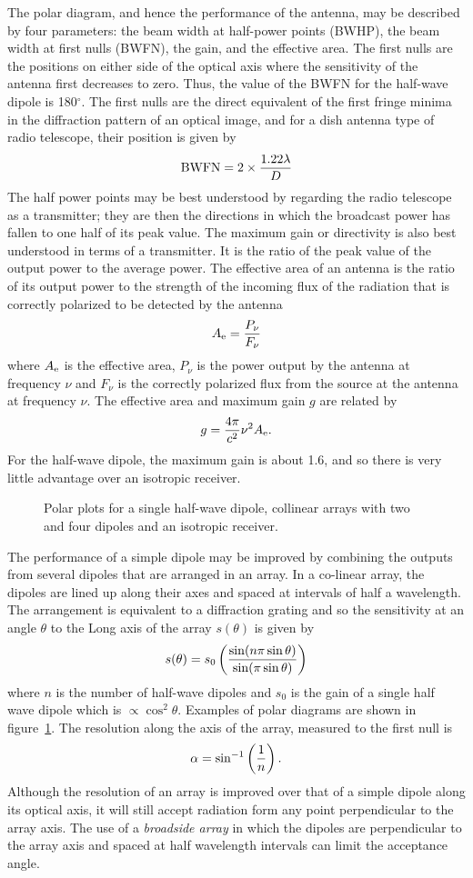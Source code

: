\documentclass{article}
\begin{document}
The polar diagram, and hence the performance of the antenna, may be described
by four parameters: the beam width at half-power points (BWHP), the 
beam width at first nulls (BWFN), the gain, and the effective area. The first
nulls are the positions on either side of the optical axis where the 
sensitivity of the antenna first decreases to zero. Thus, the value of the 
BWFN for the half-wave dipole is 180$^{\circ}$. The first nulls are the direct 
equivalent of the first fringe minima in the diffraction pattern of an optical
image, and for a dish antenna type of radio telescope, their position is given
by 
\[
{\rm BWFN}=2\times{1.22\lambda\over D}
\]
The half power points may be best understood by regarding the radio telescope
as a transmitter; they are then the directions in which the broadcast power
has fallen to one half of its peak value. The maximum gain or directivity
is also best understood in terms of a transmitter. It is the ratio of the 
peak value of the output power to the average power. The effective area of 
an antenna is the ratio of its output power to the strength of the incoming
flux of the radiation that is correctly polarized to be detected by the antenna
\[
A_{\rm e}={P_\nu\over F_\nu}
\]
where $A_{\rm e}$ is the effective area, $P_\nu$ is the power output by the 
antenna at frequency $\nu$ and $F_\nu$ is the correctly polarized flux from the
source at the antenna at frequency $\nu$. The effective area and maximum gain
$g$ are related by 
\[
g={4\pi\over c^2}\nu^2A_{\rm e}.
\]
For the half-wave dipole, the maximum gain is about 1.6, and so there is very
little advantage over an isotropic receiver. 

\begin{figure}[h]
  \centering  {}
  \caption{Polar plots for a single half-wave dipole, collinear arrays with two and four 
dipoles and an isotropic receiver.}
  \label{fig:polar_plot}
\end{figure}

The performance of a simple dipole may be improved by combining the 
outputs from several dipoles that are arranged in an array. In a co-linear 
array, the dipoles are lined up along their axes and spaced at intervals
of half a wavelength. The arrangement is equivalent to a diffraction
grating and so the sensitivity at an angle $\theta$ to the Long axis
of the array $s(\theta)$ is given by
\[
s(\theta)=s_0\left({\sin(n\pi\sin\theta)\over\sin(\pi\sin\theta)}\right)
\]
where $n$ is the number of half-wave dipoles and $s_0$ is the gain of a single
half wave dipole which is $\propto \cos^2\theta$. 
Examples of polar diagrams are shown in figure~\ref{fig:polar_plot}.
The resolution along the axis of the array, measured to the
first null is 
\[
\alpha=\sin^{-1}\left(1\over n\right).
\]
Although the resolution of an array is improved over that of a simple dipole along 
its optical axis, it will still accept radiation form any point perpendicular to the array
axis. The use of a {\it broadside array} in which the dipoles are perpendicular to the 
array axis and spaced at half wavelength intervals can limit the acceptance angle. 
\end{document}
